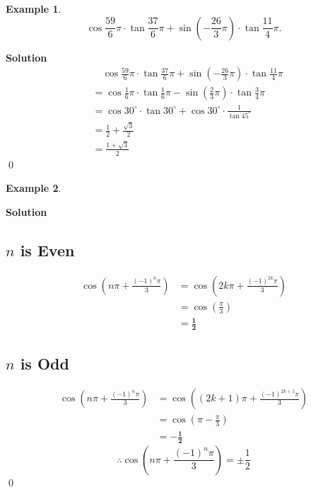 \documentclass{article}
\newtheorem*{example*}{Example}
\newenvironment{solution}{\begin{trivlist}\item[]{\bf Solution}}{\qed \end{trivlist}}
\begin{document}
\begin{example*}
    \[
    \cos\frac{59}{6}\pi \cdot \tan\frac{37}{6}\pi + \sin\left( -\frac{26}{3}\pi \right) \cdot \tan\frac{11}{4}\pi.
    \]
\end{example*}
\begin{solution}
    \begin{align*}
        & \quad \cos\frac{59}{6}\pi \cdot \tan\frac{37}{6}\pi + \sin\left( -\frac{26}{3}\pi \right) \cdot \tan\frac{11}{4}\pi \\
        &= \cos\frac{1}{6}\pi \cdot \tan\frac{1}{6}\pi - \sin\left( \frac{2}{3}\pi \right) \cdot \tan\frac{3}{4}\pi \\
        &= \cos30^{\circ} \cdot \tan30^{\circ} + \cos30^{\circ} \cdot \frac{1}{\tan45^{\circ}} \\
        &= \frac{1}{2} + \frac{\sqrt{3}}{2} \\
        &= \boxed{\frac{1 + \sqrt{3}}{2}}
    \end{align*}
\end{solution}

\begin{example*}
\end{example*}
\begin{solution}
    \subsection*{$n$ is Even}
    \begin{align*}
        \cos\left( n\pi + \frac{(-1)^n\pi}{3} \right)
        &= \cos\left( 2k\pi + \frac{(-1)^{2k}\pi}{3} \right) \\
        &= \cos\left(\frac{\pi}{3} \right) \\
        &= \mathbf{\frac{1}{2}}
    \end{align*}
    \subsection*{$n$ is Odd}
    \begin{align*}
        \cos\left( n\pi + \frac{(-1)^n\pi}{3} \right)
        &= \cos\left( (2k + 1)\pi + \frac{(-1)^{2k + 1}\pi}{3} \right) \\
        &= \cos\left(\pi - \frac{\pi}{3} \right) \\
        &= \mathbf{-\frac{1}{2}}
    \end{align*}
    \[
    \therefore \cos\left( n\pi + \frac{(-1)^n\pi}{3} \right) = \pm\frac{1}{2}
    \]
\end{solution}
\end{document}
